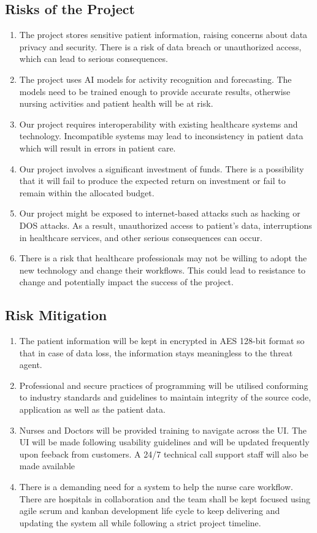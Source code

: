 \subsection{Risks of the Project}
\begin{enumerate}
        \item The project stores sensitive patient information, raising concerns about data privacy and security. There is a risk of data breach or unauthorized access, which can lead to serious consequences. 
        \item The project uses AI models for activity recognition and forecasting. The models need to be trained enough to provide accurate results, otherwise nursing activities and patient health will be at risk.
        \item Our project requires interoperability with existing healthcare systems and technology. Incompatible systems may lead to inconsistency in patient data which will result in errors in patient care.
        \item Our project involves a significant investment of funds. There is a possibility that it will fail to produce the expected return on investment or fail to remain within the allocated budget.
        \item Our project might be exposed to internet-based attacks such as hacking or DOS attacks. As a result, unauthorized access to patient's data, interruptions in healthcare services, and other serious consequences can occur.
        \item There is a risk that healthcare professionals may not be willing to adopt the new technology and change their workflows. This could lead to resistance to change and potentially impact the success of the project.
\end{enumerate}
\subsection{Risk Mitigation}
\begin{enumerate}
        \item The patient information will be kept in encrypted in AES 128-bit format so that in case of data loss, the information stays meaningless to the threat agent.
        \item Professional and secure practices of programming will be utilised conforming to industry standards and guidelines to maintain integrity of the source code, application as well as the patient data.
        \item Nurses and Doctors will be provided training to navigate across the UI. The UI will be made following usability guidelines and will be updated frequently upon feeback from customers. A 24/7 technical call support staff will also be made available
        \item There is a demanding need for a system to help the nurse care workflow. There are hospitals in collaboration and the team shall be kept focused using agile scrum and kanban development life cycle to keep delivering and updating the system all while following a strict project timeline.
\end{enumerate}
